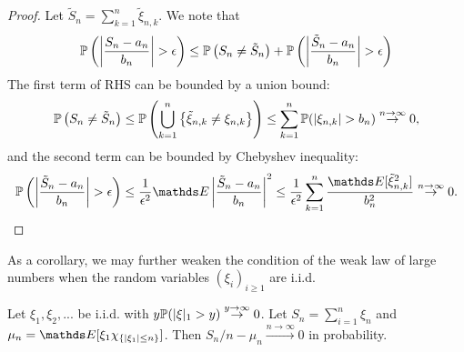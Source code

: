 \begin{unexaminable}
\begin{proof}
Let $\tilde{S}_n = \sum_{k=1}^n \tilde{\xi}_{n,k}$. We note that 
\begin{equation*}
\mathbb{P}\left( \left| \frac{S_n - a_n}{b_n} \right| > \epsilon \right) \leq \mathbb{P}\left( S_n \neq \tilde{S}_n \right) + \mathbb{P}\left( \left| \frac{\tilde{S}_n - a_n}{b_n} \right| > \epsilon \right)
\end{equation*}
The first term of RHS can be bounded by a union bound:
\begin{equation*}
    \mathbb{P}\left( S_n \neq \tilde{S}_n \right) \leq \mathbb{P}\left( \bigcup_{k=1}^n \left\{ \tilde{\xi}_{n,k} \neq \xi_{n,k} \right \} \right) \leq \sum_{k=1}^n \mathbb{P}(|\xi_{n,k}| > b_n) \overset{n\to\infty}\to 0, 
\end{equation*}
and the second term can be bounded by Chebyshev inequality:
\begin{align*}
\p\bracket{\abs{\frac{\tilde{S}_n - a_n}{b_n}} > \epsilon} \leq \frac{1}{\epsilon^2} \E\abs{\frac{\tilde{S}_n - a_n}{b_n}}^2 \leq \frac{1}{\epsilon^2} \sum_{k=1}^n \frac{\E[\tilde{\xi}_{n,k}^2]}{b_n^2} \overset{n\to\infty}\to 0.
\end{align*}
\end{proof}

As a corollary, we may further weaken the condition of the weak law of large numbers when the random variables $(\xi_i)_{i\geq 1}$ are i.i.d.

\begin{corollary}
Let $\xi_1, \xi_2, ...$ be i.i.d. with $y\mathbb{P}(|\xi|_1 > y) \overset{y\to\infty}\to 0$. Let $S_n = \sum_{i=1}^n \xi_n$ and $\mu_n = \E[\xi_1 \chi_{\set{|\xi_1|\leq n}}]$. Then $S_n/n - \mu_n \overset{n\to\infty}\to 0$ in probability.
\end{corollary}


\end{unexaminable}
